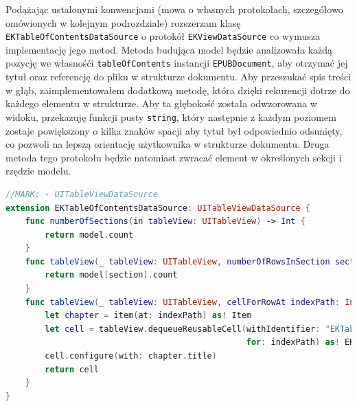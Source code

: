 Podążając ustalonymi konwencjami (mowa o własnych protokołach, szczegółowo omówionych w kolejnym podrozdziale) rozszerzam klasę \texttt{EKTableOfContentsDataSource} o protokół \texttt{EKViewDataSource} co wymusza implementację jego metod. Metoda budująca model będzie analizowała każdą pozycję we własnośći \texttt{tableOfContents} instancji \texttt{EPUBDocument}, aby otrzymać jej tytuł oraz referencję do pliku w strukturze dokumentu. Aby przeszukać spis treści w głąb, zaimplementowałem dodatkową metodę, która dzięki rekurencji dotrze do każdego elementu w strukturze. Aby ta głębokość została odwzorowana w widoku, przekazuję funkcji pusty \texttt{string}, który następnie z każdym poziomem zostaje powiększony o kilka znaków spacji aby tytuł był odpowiednio odsunięty, co pozwoli na lepszą orientację użytkownika w strukturze dokumentu. Druga metoda tego protokołu będzie natomiast zwracać element w określonych sekcji i rzędzie modelu.

\begin{lstlisting}[language=swift,caption={Rozszerzenie klasy \texttt{EKTableOfContentsDataSource} o protokół \texttt{UITableViewDataSource}}, label=EKTableOfContentsViewController-extension-2]
//MARK: - UITableViewDataSource
extension EKTableOfContentsDataSource: UITableViewDataSource {
    func numberOfSections(in tableView: UITableView) -> Int {
        return model.count
    }
    func tableView(_ tableView: UITableView, numberOfRowsInSection section: Int) -> Int {
        return model[section].count
    }
    func tableView(_ tableView: UITableView, cellForRowAt indexPath: IndexPath) -> UITableViewCell {
        let chapter = item(at: indexPath) as! Item
        let cell = tableView.dequeueReusableCell(withIdentifier: "EKTableOfContentsViewCell" ,
                                                 for: indexPath) as! EKTableOfContentsViewCell
        cell.configure(with: chapter.title)
        return cell
    }
}
\end{lstlisting}


